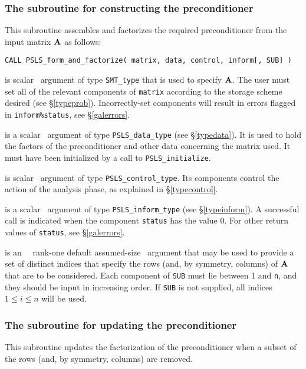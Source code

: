 \documentclass{galahad}
\newcommand{\packagename}{PSLS}
\begin{document}
\subsubsection{The subroutine for constructing the preconditioner}
This subroutine assembles and factorizes the required preconditioner
from the input matrix ${\mathbf{A}}$ as follows:

\hskip0.5in
{\tt CALL \packagename\_form\_and\_factorize( matrix, data, control, inform[, SUB] )}

\begin{description}
 is scalar \intentin\ argument of type {\tt SMT\_type}
that is used to specify ${\mathbf{A}}$.
The user must set all of the relevant components of {\tt matrix} according
to the storage scheme desired (see \S\ref{typeprob}).
Incorrectly-set components will result in errors
flagged in {\tt inform\%status}, see \S\ref{galerrors}.

 is a scalar \intentinout\ argument of type
{\tt \packagename\_data\_type}
(see \S\ref{typedata}). It is used to hold the factors of the preconditioner 
and other data concerning the matrix used.
It must have been initialized by a call to
{\tt \packagename\_ini\-tialize}.

 is scalar \intentin\ argument of type
{\tt \packagename\_control\_type}. Its components control the action
of the analysis phase, as explained in
\S\ref{typecontrol}.

 is a scalar \intentinout\ argument of type
{\tt \packagename\_inform\_type}
(see \S\ref{typeinform}).
A successful call is indicated when the  component {\tt status} has the value 0.
For other return values of {\tt status}, see \S\ref{galerrors}.

 is an \optional\ \intentin\ rank-one default assumed-size 
\integer\ argument that may be used to provide a set of distinct indices
that specify the rows (and, by symmetry, columns) of ${\mathbf{A}}$ that are 
to be considered. Each component of {\tt SUB} must lie between 1 and {\tt n},
and they should be input in increasing order.
If {\tt SUB} is not supplied, all indices $1 \leq i \leq n$ will be used. 
\end{description}


\subsubsection{The subroutine for updating the preconditioner}
This subroutine updates the factorization of the preconditioner
when a subset of the rows (and, by symmetry, columns) are removed.
\end{document}
